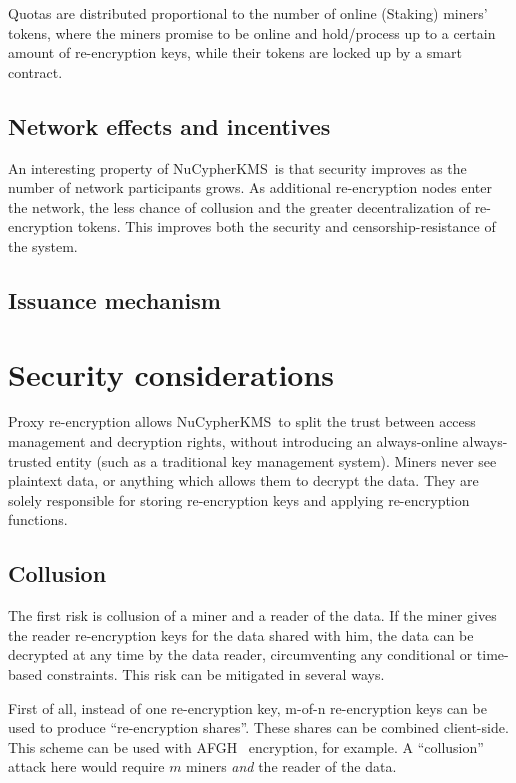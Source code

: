 \documentclass[notitlepage,longbibliography]{revtex4-1}
\newcommand{\kms}{NuCypherKMS}
\begin{document}
Quotas are distributed proportional to the number of online (Staking) miners' tokens,
where the miners promise to be online and hold/process up to a certain amount of re-encryption keys,
while their tokens are locked up by a smart contract.

\subsection{Network effects and incentives}
An interesting property of \kms~is that security improves as the number of network participants grows. As additional re-encryption
nodes enter the network, the less chance of collusion and the greater decentralization of re-encryption tokens. This improves both the
security and censorship-resistance of the system.

\subsection{Issuance mechanism}

\section{Security considerations}

Proxy re-encryption allows \kms~to split the trust between access management and decryption rights,
without introducing an always-online always-trusted entity (such as a traditional key management system).
Miners never see plaintext data, or anything which allows them to decrypt the data.
They are solely responsible for storing re-encryption keys and applying re-encryption functions.

\subsection{Collusion}
The first risk is collusion of a miner and a reader of the data.
If the miner gives the reader re-encryption keys for the data shared with him,
the data can be decrypted at any time by the data reader, circumventing any conditional or time-based constraints.
This risk can be mitigated in several ways.

First of all, instead of one re-encryption key, m-of-n re-encryption keys can be used to produce ``re-encryption shares''.
These shares can be combined client-side.
This scheme can be used with AFGH~\cite{AFGH} encryption, for example.
A ``collusion'' attack here would require $m$ miners \emph{and} the reader of the data.
\end{document}

